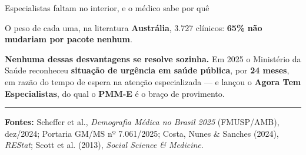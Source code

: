 \documentclass[aspectratio=169,11pt]{beamer}
\def\rastreiotexto{}
\newcommand{\rastreio}[1]{\gdef\rastreiotexto{#1}}
\newcommand{\fonte}[1]{%
  \vfill
  {\color{verdeMedio}\rule{\textwidth}{0.4pt}}\par
  \vspace{0.25em}
  {\color{cinzaFonte}\scriptsize\setlength{\baselineskip}{1.05\baselineskip}#1\par}%
}
\newcommand{\lead}[1]{{\color{verdeEscuro}\bfseries #1}}
\newcommand{\num}[1]{{\color{verdeMeio}\bfseries #1}}
\begin{document}
\begin{frame}{Especialistas faltam no interior, e o médico sabe por quê}
{\begin{block}{O peso de cada uma, na literatura}
      \vspace{0.4em}
      \textbf{Austrália}, 3.727 clínicos: \num{65\% não mudariam por pacote
      nenhum}.
    \end{block}

    \vspace{1.0em}
    {\small \lead{Nenhuma dessas desvantagens se resolve sozinha.} Em 2025 o
    Ministério da Saúde reconheceu \num{situação de urgência em saúde pública},
    por \textbf{24 meses}, em razão do tempo de espera na atenção especializada
    --- e lançou o \textbf{Agora Tem Especialistas}, do qual o \textbf{PMM-E} é
    o braço de provimento.}
  }%

  \fonte{\textbf{Fontes:} Scheffer et al., \textit{Demografia Médica no Brasil
  2025} (FMUSP/AMB), dez/2024; Portaria GM/MS nº 7.061/2025; Costa, Nunes \&
  Sanches (2024), \textit{REStat}; Scott et al. (2013), \textit{Social Science
  \& Medicine}.}
\end{frame}

\rastreio{1. Motivação \textperiodcentered\ A política \textperiodcentered\ 1 de 2}
\end{document}
